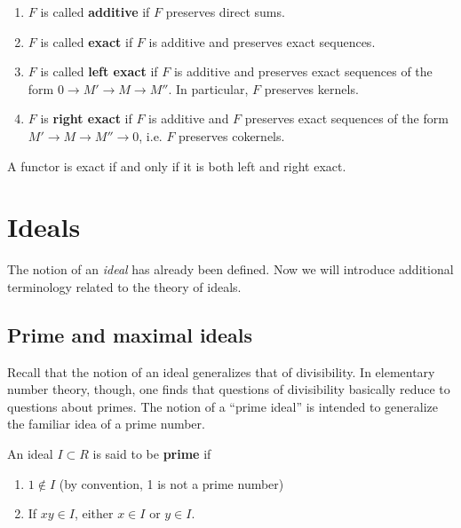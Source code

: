 \begin{definition} 
\begin{enumerate}
\item  $F$ is called \textbf{additive} if $F$ preserves direct sums.  
\item  $F$ is called \textbf{exact} if $F$ is additive and preserves exact sequences.  
\item  $F$ is called \textbf{left exact} if $F$ is additive and preserves exact sequences of the form
$0 \to M' \to M \to M''$.  In particular, $F$ preserves kernels.  
\item  $F$ is \textbf{right exact} if $F$ is additive and $F$ preserves exact
sequences of the form $M' \to M \to M'' \to 0$, i.e. $F$ preserves cokernels.  
\end{enumerate}
\end{definition} 

A functor is exact if and only if it is both left and right exact.  




\section{Ideals}

The notion of an \emph{ideal} has already been defined. Now we will introduce additional terminology related to the theory of ideals.

\subsection{Prime and maximal ideals}

Recall that the notion of an ideal generalizes that of divisibility. In
elementary number theory, though, one finds that questions of divisibility
basically reduce to questions about primes. 
The notion of a ``prime ideal'' is intended to generalize the familiar idea of a prime
number.

\begin{definition} 
An ideal $I \subset R$ is said to be \textbf{prime} if
\begin{enumerate}[\textbf{P} 1]
\item  $1 \notin I$ (by convention, 1 is not a prime number)
\item If $xy \in I$, either $x \in I$ or $y \in I$.
\end{enumerate}
\end{definition} 

